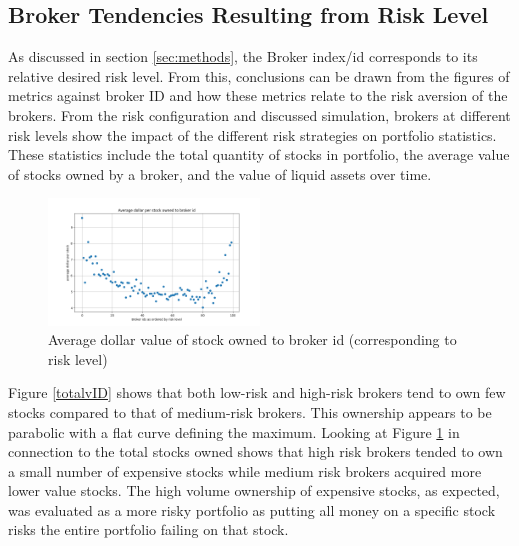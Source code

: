 \documentclass[letterpaper, 11 pt, proceedings]{IEEEtran}
\begin{document}
	\subsection{Broker Tendencies Resulting from Risk Level}\label{subsec:tendencies}	
	As discussed in section \ref{sec:methods}, the Broker index/id corresponds to its relative desired risk level. From this, conclusions can be drawn from the figures of metrics against broker ID and how these metrics relate to the risk aversion of the brokers. From the risk configuration and discussed simulation, brokers at different risk levels show the impact of the different risk strategies on portfolio statistics. These statistics include the total quantity of stocks in portfolio, the average value of stocks owned by a broker, and the value of liquid assets over time.
	

	
	\begin{figure}[h]
		\centering
		\includegraphics[width=0.5\textwidth]{averageDollarPerStockToBrokerIds.png}
		\caption{Average dollar value of stock owned to broker id (corresponding to risk level)}
		\label{dollarValue}
	\end{figure}
	\FloatBarrier
	
	Figure \ref{totalvID} shows that both low-risk and high-risk brokers tend to own few stocks compared to that of medium-risk brokers. This ownership appears to be parabolic with a flat curve defining the maximum. Looking at Figure \ref{dollarValue} in connection to the total stocks owned shows that high risk brokers tended to own a small number of expensive stocks while medium risk brokers acquired more lower value stocks. The high volume ownership of expensive stocks, as expected, was evaluated as a more risky portfolio as putting all money on a specific stock risks the entire portfolio failing on that stock.

	
\end{document}
